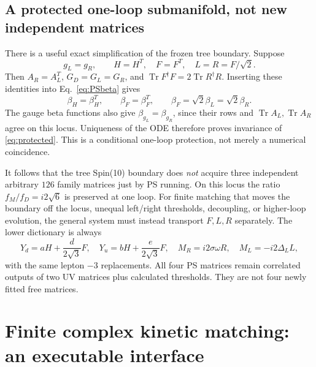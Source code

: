 \documentclass[11pt]{article}
\newcommand{\tr}{\operatorname{Tr}}
\begin{document}
\subsection{A protected one-loop submanifold, not new independent matrices}
There is a useful exact simplification of the frozen tree boundary.
Suppose
\begin{equation}
g_L=g_R,\qquad H=H^T,\quad F=F^T,\quad
L=R=F/\sqrt2.
\label{eq:protected}
\end{equation}
Then $A_R=A_L^T$, $G_D=G_L=G_R$, and
$\tr F^\dagger F=2\tr R^\dagger R$.
Inserting these identities into Eq.~\eqref{eq:PSbeta} gives
\begin{equation}
\beta_H=\beta_H^T,\qquad \beta_F=\beta_F^T,\qquad
\beta_F=\sqrt2\beta_L=\sqrt2\beta_R.
\end{equation}
The gauge beta functions also give $\beta_{g_L}=\beta_{g_R}$, since their
rows and $\tr A_L,\tr A_R$ agree on this locus. Uniqueness of the ODE
therefore proves invariance of \eqref{eq:protected}. This is a conditional
one-loop protection, not merely a numerical coincidence.

It follows that the tree Spin(10) boundary does \emph{not} acquire three
independent arbitrary $126$ family matrices just by PS running. On this
locus the ratio $f_M/f_D=i2\sqrt6$ is preserved at one loop. For finite
matching that moves the boundary off the locus, unequal left/right
thresholds, decoupling, or higher-loop evolution, the general system must
instead transport $F,L,R$ separately. The lower dictionary is always
\begin{equation}
Y_d=aH+\frac{d}{2\sqrt3}F,\quad
Y_u=bH+\frac{e}{2\sqrt3}F,\quad
M_R=i2\sigma\omega R,\quad M_L=-i2\Delta_L L,
\end{equation}
with the same lepton $-3$ replacements. All four PS matrices remain
correlated outputs of two UV matrices plus calculated thresholds. They
are not four newly fitted free matrices.

\section{Finite complex kinetic matching: an executable interface}
\end{document}
